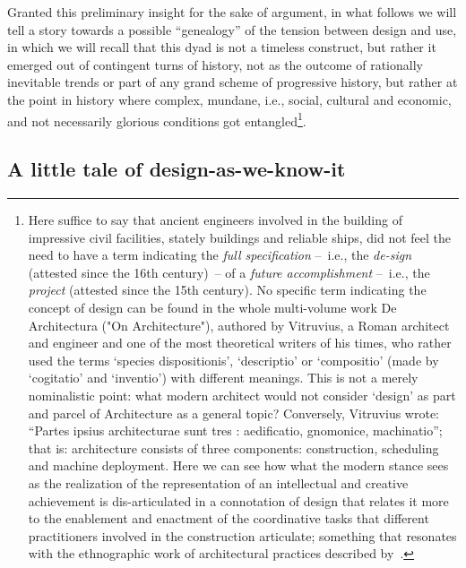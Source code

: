 \documentclass{article}
\begin{document}
Granted this preliminary insight for the sake of argument, in what follows we will tell a story towards a possible ``genealogy'' 
of the tension between design and use, in which we will recall that this dyad is not a timeless construct, but rather it emerged out of contingent turns of history, not as the outcome of rationally inevitable trends or part of any grand scheme of progressive history, but rather at the point in history where complex, mundane, i.e., social, cultural and economic, and not necessarily glorious conditions got entangled\footnote{Here suffice to say that ancient engineers involved in the building of impressive civil facilities, stately buildings and reliable ships, did not feel the need to have a term indicating the \emph{full specification} --~i.e., the \emph{de-sign} (attested since the 16th century)~-- of a \emph{future accomplishment} --~i.e., the \emph{project} (attested since the 15th century). No specific term indicating the concept of design can be found in the whole multi-volume work De Architectura ("On Architecture"), authored by Vitruvius, a Roman architect and engineer and one of the most theoretical writers of his times, who rather used the terms `species dispositionis', `descriptio' or `compositio' (made by `cogitatio' and `inventio') with different meanings. This is not a merely nominalistic point: what modern architect would not consider `design' as part and parcel of Architecture as a general topic? Conversely, Vitruvius wrote: ``Partes ipsius architecturae sunt tres : aedificatio, gnomonice, machinatio''; that is: architecture consists of three components: construction, scheduling and machine deployment. Here we can see how what the modern stance sees as the realization of the representation of an intellectual and creative achievement is dis-articulated in a connotation of design that relates it more to the enablement and enactment of the coordinative tasks that different practitioners involved in the construction articulate; something that resonates with the ethnographic work of architectural practices described by~\citet{schmidt_ordering_2004}.}.








\subsection{A little tale of design-as-we-know-it}
\label{subsec:story}
\end{document}
